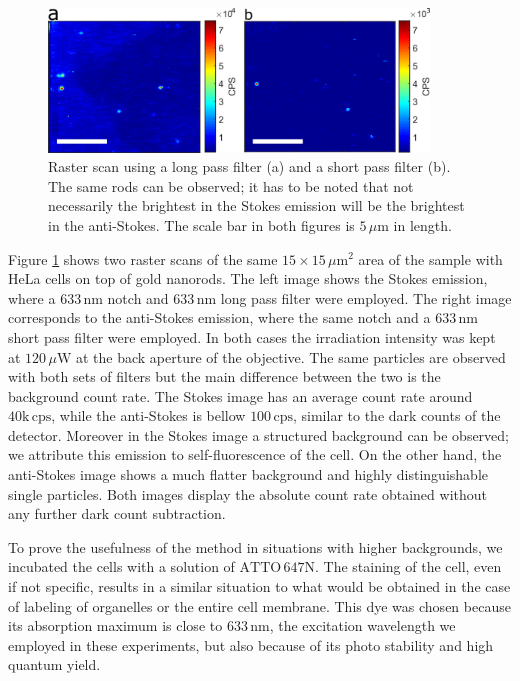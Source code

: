 \documentclass[journal=nalefd,manuscript=letter]{achemso}
\newcommand{\nm}{\ensuremath{\,\textrm{nm}}}
\newcommand{\um}{\ensuremath{\,\mu\textrm{m}}}
\newcommand{\uW}{\ensuremath{\,\mu\textrm{W}}}
\newcommand{\CPS}{\ensuremath{\,\textrm{cps}}}
\newcommand{\atto}{\ensuremath{\textrm{ATTO}\,647\textrm{N}}}
\begin{document}
\begin{figure}[htp]
\centering
	\includegraphics[width=0.9\textwidth]{Figures/04_Stokes_AS/stokes_as_no_dye.png}
	\caption{Raster scan using a long pass filter (a) and a short pass filter (b).
	The same rods can be observed; it has to be noted that not necessarily the
	brightest in the Stokes emission will be the brightest in the anti-Stokes. The
	scale bar in both figures is $5\um$ in length.}
	\label{fig:stokes_as_no_dye}
\end{figure}

Figure \ref{fig:stokes_as_no_dye} shows two raster scans of the same
$15\times15\um^2$ area of the sample with HeLa cells on top of gold nanorods.
The left image shows the Stokes emission, where a $633\nm$ notch and $633\nm$
long pass filter were employed. The right image corresponds to the anti-Stokes
emission, where the same notch and a $633\nm$ short pass filter were employed.
In both cases the irradiation intensity was kept at $120\uW$ at the back
aperture of the objective. The same particles are observed with both sets of
filters but the main difference between the two is the background count rate.
The Stokes image has an average count rate around $40\textrm{k}\CPS$, while the
anti-Stokes is bellow $100\CPS$, similar to the dark counts of the detector.
Moreover in the Stokes image a structured background can be observed; we
attribute this emission to self-fluorescence of the cell. On the other hand, the
anti-Stokes image shows a much flatter background and highly
distinguishable single particles. Both images display the absolute count rate
obtained without any further dark count subtraction.

To prove the usefulness of the method in situations with higher
backgrounds, we incubated the cells with a solution of \atto.
The staining of the cell, even if not specific, results in a similar situation
to what would be obtained in the case of labeling of organelles or
the entire cell membrane. This dye was chosen because its absorption maximum is
close to $633\nm$, the excitation wavelength we employed in these
experiments, but also because of its photo stability and high quantum yield.
\end{document}
